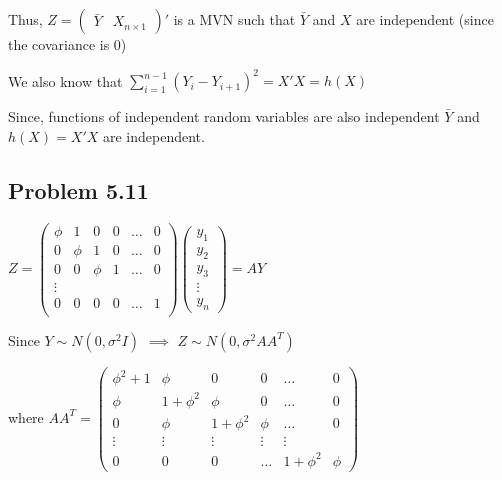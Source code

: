 \documentclass[a4paper]{article}
\begin{document}
Thus, $Z=\begin{pmatrix}\bar{Y} & X_{n \times 1}\end{pmatrix}'$ is a MVN such that $\bar{Y}$ and $X$ are independent (since the covariance is 0)

We also know that $\sum_{i=1}^{n-1}(Y_i-Y_{i+1})^2=X'X = h(X)$

Since, functions of independent random variables are also independent $\bar{Y}$ and $h(X) = X'X$ are independent.

\subsection*{Problem 5.11}

$Z = \begin{pmatrix} \phi & 1 & 0 & 0 & \dots & 0\\ 0 & \phi & 1 & 0 & \dots & 0\\ 
0 & 0 & \phi & 1 &  \dots & 0\\ 
\vdots\\
0 & 0 & 0 & 0 & \dots & 1\\ 
\end{pmatrix} \begin{pmatrix} y_1\\ y_2 \\ y_3\\ \vdots\\ y_n\end{pmatrix} = AY$

Since $Y \sim N(0, \sigma^2I)$ $\implies$ $Z \sim N(0, \sigma^2 AA^T)$

where $AA^T = \begin{pmatrix}\phi^2+1 & \phi & 0 & 0 & \dots & 0\\ 
\phi & 1+\phi^2 & \phi & 0 & \dots & 0\\
0 & \phi & 1+\phi^2 & \phi & \dots & 0\\
\vdots & \vdots & \vdots & \vdots & \vdots\\
0 & 0 & 0 & \dots & 1+\phi^2 & \phi
\end{pmatrix}$
\end{document}
